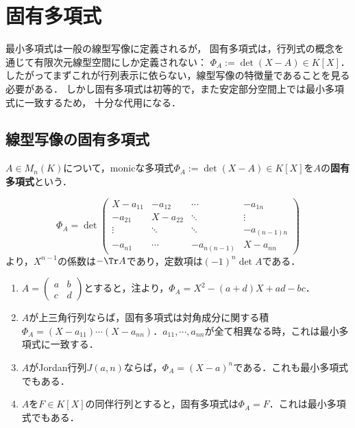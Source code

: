 \documentclass[uplatex, dvipdfmx]{jsreport}
\begin{document}
\section{固有多項式}

\begin{tcolorbox}[colframe=ForestGreen, colback=ForestGreen!10!white, breakable]
    最小多項式は一般の線型写像に定義されるが，
    固有多項式は，行列式の概念を通じて有限次元線型空間にしか定義されない：
    $\Phi_A:=\det(X-A)\in K[X]$．
    したがってまずこれが行列表示に依らない，線型写像の特徴量であることを見る必要がある．
    しかし固有多項式は初等的で，また安定部分空間上では最小多項式に一致するため，
    十分な代用になる．
\end{tcolorbox}

\subsection{線型写像の固有多項式}

\begin{definition}
    $A\in M_n(K)$について，monicな多項式$\Phi_A:=\det(X-A)\in K[X]$を$A$の\textbf{固有多項式}という．
\end{definition}

\begin{remark}[固有方程式の最高次係数と定数項としての特徴付け]
    \[ \Phi_A=\det\begin{pmatrix}X-a_{11}&-a_{12}&\cdots&-a_{1n}\\-a_{21}&X-a_{22}&\ddots&\vdots\\\vdots&\ddots&\ddots&-a_{(n-1)n}\\-a_{n1}&\cdots&-a_{n(n-1)}&X-a_{nn}\end{pmatrix} \]
    より，$X^{n-1}$の係数は$-\Tr A$であり，定数項は$(-1)^n\det A$である．
\end{remark}

\begin{example}\mbox{}\label{example-eigenpolynomial}
    \begin{enumerate}
        \item $A=\begin{pmatrix}a&b\\c&d\end{pmatrix}$とすると，注より，$\Phi_A=X^2-(a+d)X+ad-bc$．
        \item $A$が上三角行列ならば，固有多項式は対角成分に関する積$\Phi_A=(X-a_{11})\cdots(X-a_{nn})$．$a_{11},\cdots,a_{nn}$が全て相異なる時，これは最小多項式に一致する．
        \item $A$がJordan行列$J(a,n)$ならば，$\Phi_A=(X-a)^n$である．これも最小多項式でもある．
        \item $A$を$F\in K[X]$の同伴行列とすると，固有多項式は$\Phi_A=F$．これは最小多項式でもある．
    \end{enumerate}
\end{example}
\end{document}
